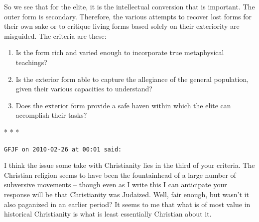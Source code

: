 So we see that for the elite, it is the intellectual conversion that is important. The outer form is secondary. Therefore, the various attempts to recover lost forms for their own sake or to critique living forms based solely on their exteriority are misguided. The criteria are these:

\begin{enumerate}


\item Is the form rich and varied enough to incorporate true metaphysical teachings?

\item Is the exterior form able to capture the allegiance of the general population, given their various capacities to understand?

\item Does the exterior form provide a safe haven within which the elite can accomplish their tasks?
\end{enumerate}




\begin{center}* * *\end{center}

\begin{footnotesize}
\begin{sffamily}
\texttt{GFJF on 2010-02-26 at 00:01 said:}

I think the issue some take with Christianity lies in the third of your criteria. The Christian religion seems to have been the fountainhead of a large number of subversive movements -- though even as I write this I can anticipate your response will be that Christianity was Judaized. Well, fair enough, but wasn't it also paganized in an earlier period? It seems to me that what is of most value in historical Christianity is what is least essentially Christian about it.

\hfill

\end{sffamily}
\end{footnotesize}

